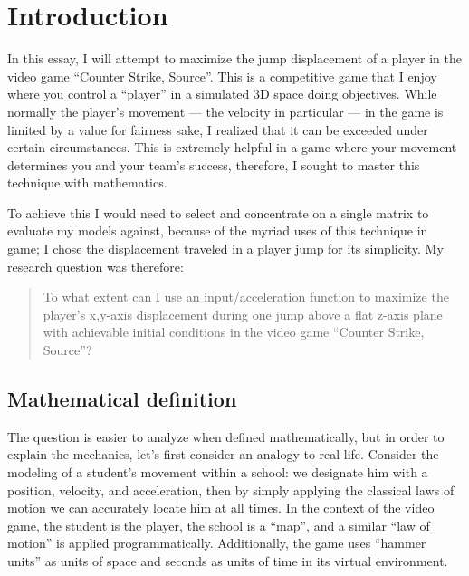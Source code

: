 \section{Introduction}


In this essay, I will attempt to maximize the jump displacement of a player in the video game ``Counter Strike, Source''. This is a competitive game that I enjoy where you control a ``player'' in a simulated 3D space doing objectives. While normally the player's movement --- the velocity in particular --- in the game is limited by a value for fairness sake, I realized that it can be exceeded under certain circumstances. This is extremely helpful in a game where your movement determines you and your team's success, therefore, I sought to master this technique with mathematics.


To achieve this I would need to select and concentrate on a single matrix to evaluate my models against, because of the myriad uses of this technique in game; I chose the displacement traveled in a player jump for its simplicity. My research question was therefore:
\begin{quote}
    To what extent can I use an input/acceleration function to maximize the player's x,y-axis displacement during one jump above a flat z-axis plane with achievable initial conditions in the video game ``Counter Strike, Source''?
\end{quote}

\subsection{Mathematical definition}
The question is easier to analyze when defined mathematically, but in order to explain the mechanics, let's first consider an analogy to real life. Consider the modeling of a student's movement within a school: we designate him with a position, velocity, and acceleration, then by simply applying the classical laws of motion we can accurately locate him at all times. In the context of the video game, the student is the player, the school is a ``map'', and a similar ``law of motion'' is applied programmatically. Additionally, the game uses ``hammer units'' as units of space and seconds as units of time in its virtual environment.


